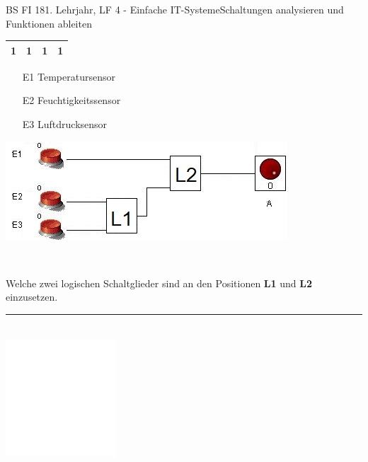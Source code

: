\documentclass[oneside,openany,headings=optiontotoc,11pt,numbers=noenddot]{scrreprt}
\begin{document}
\begin{worksheet}{BS FI 18}{1. Lehrjahr, LF 4 - Einfache IT-Systeme}{Schaltungen analysieren und Funktionen ableiten}
\begin{framed}
\begin{minipage}{0.25\textwidth}
\begin{tabular}{|c|c|c|c|}
					\hline
					1 & 1 & 1 & 1\\
					\hline
				\end{tabular}
				\begin{itemize}
					\item[E1] Temperatursensor
					\item[E2] Feuchtigkeitssensor
					\item[E3] Luftdrucksensor
				\end{itemize}
			\end{minipage}
			\hfill
			\begin{minipage}{0.7\textwidth}
				\includegraphics[width=\textwidth]{../99_Bilder/190308_SA_1.jpg}
			\end{minipage}\\
			\par\noindent
			Welche zwei logischen Schaltglieder sind an den Positionen \textbf{L1} und \textbf{L2} einzusetzen.\\
			\par\noindent
			\rule{\textwidth}{0.1pt}\\
			\includegraphics[width=0.31\textwidth]{../../empty.jpg}
		\end{framed}
	\end{worksheet}
\end{document}
